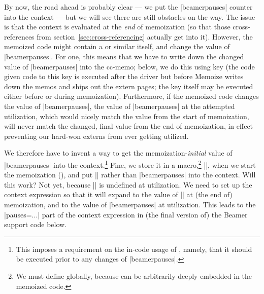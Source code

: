 \documentclass[a4paper,11pt]{article}
\begin{document}
By now, the road ahead is probably clear --- we put the |beamerpauses| counter
into the context --- but we will see there are still obstacles on the way.  The
issue is that the context is evaluated at the \emph{end} of memoization (so
that those cross-references from section~\ref{sec:cross-referencing} actually
get into it).  However, the memoized code might contain a  or similar
itself, and change the value of |beamerpauses|.  For one, this means that we
have to write down the changed value of |beamerpauses| into the cc-memo; below,
we do this using key  (the code given code to this
key is executed after the driver but before Memoize writes down the memos and
ships out the extern pages; the key itself may be executed either before or
during memoization).  Furthermore, if the memoized code changes the value of
|beamerpauses|, the value of |beamerpauses| at the attempted utilization, which
would nicely match the value from the start of memoization, will never match
the changed, final value from the end of memoization, in effect preventing our
hard-won externs from ever getting utilized.

We therefore have to invent a way to get the memoization-\emph{initial} value
of |beamerpauses| into the context.\footnote{This imposes a requirement on the
  in-code usage of , namely, that it should be executed
  prior to any changes of |beamerpauses|.}  Fine, we store it in a
macro,\footnote{We must define  globally, because
   can be arbitrarily deeply embedded in the memoized
  code.} |\mmzBeamerPauses|, when we start the memoization (), and put |\mmzBeamerPauses| rather than |beamerpauses| into the
context.  Will this work?  Not yet, because |\mmzBeamerPauses| is undefined at
utilization.  We need to set up the context expression so that it will expand
to the value of |\mmzBeamerPauses| at (the end of) memoization, and to the
value of |beamerpauses| at utilization.  This leads to the
|pauses=\ifmemoizing...| part of the context expression in (the final version
  of) the Beamer support code below.

\medskip %

\end{document}
